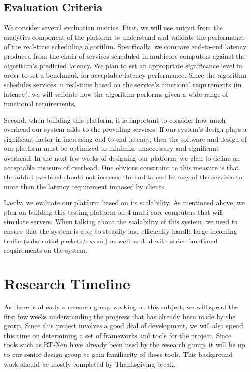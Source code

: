 \documentclass{sig-alternate}
\begin{document}
\subsection{Evaluation Criteria}
\label{subsec:eval_criteria}

We consider several evaluation metrics. First, we will use output from the analytics component of the platform to understand and validate the performance of the real-time scheduling algorithm. Specifically, we compare end-to-end latency produced from the chain of services scheduled in multicore computers against the algorithm's predicted latency. We plan to set an appropriate significance level in order to set a benchmark for acceptable latency performance. Since the algorithm schedules services in real-time based on the service's functional requirements (in latency), we will validate how the algorithm performs given a wide range of functional requirements.

Second, when building this platform, it is important to consider how much overhead our system adds to the providing services. If our system's design plays a significant factor in increasing end-to-end latency, then the software and design of our platform must be optimized to minimize unnecessary and significant overhead. In the next few weeks of designing our platform, we plan to define an acceptable measure of overhead. One obvious constraint to this measure is that the added overhead should not increase the end-to-end latency of the services to more than the latency requirement imposed by clients.

Lastly, we evaluate our platform based on its scalability. As mentioned above, we plan on building this testing platform on 4 multi-core computers that will simulate servers. When talking about the scalability of this system, we need to ensure that the system is able to steadily and efficiently handle large incoming traffic (substantial packets/second) as well as deal with strict functional requirements on the system.


\section{Research Timeline}
\label{sec:research_timeline}

As there is already a research group working on this subject, we will spend the first few weeks understanding the progress that has already been made by the group. Since this project involves a good deal of development, we will also spend this time on determining a set of frameworks and tools for the project. Since tools such as RT-Xen have already been used by the research group, it will be up to our senior design group to gain familiarity of these tools. This background work should be mostly completed by Thanksgiving break.
\end{document}
